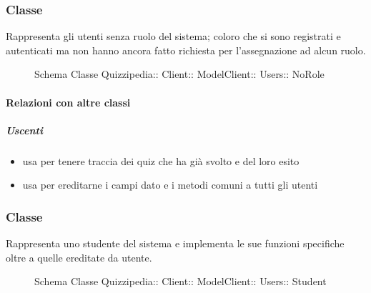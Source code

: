 \subsubsection{Classe }
Rappresenta gli utenti senza ruolo del sistema; coloro che si sono registrati e autenticati ma non hanno ancora fatto richiesta per l'assegnazione ad alcun ruolo.
\begin{figure}[H]
\centering
\noindent{}
\caption[Schema Classe NoRole]{Schema Classe Quizzipedia:: Client:: ModelClient:: Users:: NoRole}
\end{figure}
\paragraph{Relazioni con altre classi}
\subparagraph{Uscenti}
\begin{itemize}
\item usa  per tenere traccia dei quiz che ha già svolto e del loro esito
\item usa  per ereditarne i campi dato e i metodi comuni a tutti gli utenti
\end{itemize}
\subsubsection{Classe }
Rappresenta uno studente del sistema e implementa le sue funzioni specifiche oltre a quelle ereditate da utente.
\begin{figure}[H]
\centering
\noindent{}
\caption[Schema Classe Student]{Schema Classe Quizzipedia:: Client:: ModelClient:: Users:: Student}
\end{figure}

